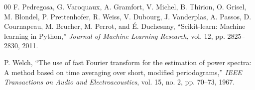 \begin{thebibliography}{00}
F. Pedregosa, G. Varoquaux, A. Gramfort, V. Michel, B. Thirion, O. Grisel,
M. Blondel, P. Prettenhofer, R. Weiss, V. Dubourg, J. Vanderplas, A. Passos,
D. Cournapeau, M. Brucher, M. Perrot, and \'{E}. Duchesnay, ``Scikit-learn:
Machine learning in Python,'' \textit{Journal of Machine Learning Research},
vol. 12, pp. 2825--2830, 2011.


P. Welch, ``The use of fast Fourier transform for the estimation of power spectra:
A method based on time averaging over short, modified periodograms,''
\textit{IEEE Transactions on Audio and Electroacoustics}, vol. 15, no. 2,
pp. 70--73, 1967.

\end{thebibliography}

